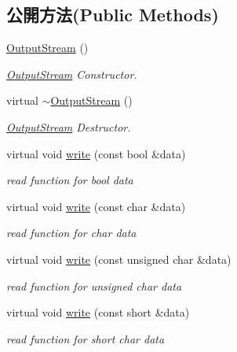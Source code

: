 \subsection*{公開方法(Public Methods)}
\begin{DoxyCompactItemize}
\item 
\hyperlink{class_magnum_1_1_output_stream_a9d81f208c1f094123abd68a1b35898af}{Output\+Stream} ()
\begin{DoxyCompactList}\small\item\em \hyperlink{class_magnum_1_1_output_stream}{Output\+Stream} Constructor. \end{DoxyCompactList}\item 
virtual \hyperlink{class_magnum_1_1_output_stream_a0e63481676582adb93cae5970d16d37a}{$\sim$\+Output\+Stream} ()
\begin{DoxyCompactList}\small\item\em \hyperlink{class_magnum_1_1_output_stream}{Output\+Stream} Destructor. \end{DoxyCompactList}\item 
virtual void \hyperlink{class_magnum_1_1_output_stream_a6df894c65be4c31bc8b22d7156c8e2ea}{write} (const bool \&data)
\begin{DoxyCompactList}\small\item\em read function for bool data \end{DoxyCompactList}\item 
virtual void \hyperlink{class_magnum_1_1_output_stream_adac686febd56e8a037ff4057a867f0e6}{write} (const char \&data)
\begin{DoxyCompactList}\small\item\em read function for char data \end{DoxyCompactList}\item 
virtual void \hyperlink{class_magnum_1_1_output_stream_ac903cdb4a060bf7fe1fb2f227636a8f4}{write} (const unsigned char \&data)
\begin{DoxyCompactList}\small\item\em read function for unsigned char data \end{DoxyCompactList}\item 
virtual void \hyperlink{class_magnum_1_1_output_stream_a1a3a6d2105acd50b52204aeb97146348}{write} (const short \&data)
\begin{DoxyCompactList}\small\item\em read function for short char data \end{DoxyCompactList}\item 

\end{DoxyCompactItemize}

